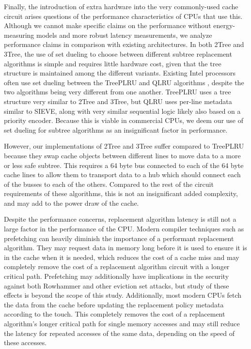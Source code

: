 \documentclass[letterpaper]{article}
\begin{document}
Finally, the introduction of extra hardware into the very commonly-used cache circuit
arises questions of the performance characteristics of CPUs that use this.
Although we cannot make specific claims on the performance without energy-measuring models
and more robust latency measurements,
we analyze performance claims in comparison with existing architectures.
In both 2Tree and 3Tree, the use of set dueling to choose between different subtree replacement algorithms
is simple and requires little hardware cost, given that the tree structure is maintained
among the different variants.
Existing Intel processors often use set dueling between the TreePLRU and QLRU algorithms
\cite{EvictionSetsAtScale}, despite the two algorithms being very different from one another.
TreePLRU uses a tree structure very similar to 2Tree and 3Tree,
but QLRU uses per-line metadata similar to SIEVE,
along with very similar sequential logic likely also based on a priority encoder.
Because this is viable in commercial CPUs, we deem our use of set dueling for subtree algorithms
as an insignificant factor in performance.

However, our implementations of 2Tree and 3Tree suffer compared to TreePLRU
because they swap cache objects between different lines to move data to a more or less safe subtree.
This requires a 64 byte bus connected to each of the 64 byte cache lines
to allow them to transport data to a hub which should connect each of the busses to each of the others.
Compared to the rest of the circuit requirements of these algorithms,
this is not an insignificant added complexity, and may add to the power draw of the cache.

Despite the performance concerns,
replacement algorithm latency is still not a large factor in the performance of the CPU.
Modern compiler techniques such as prefetching can heavily diminish the importance
of a performant replacement algorithm.
They may request data in memory long before it is used to ensure it is in the cache when it is needed,
which reduces the cost of a cache miss
and may completely remove the cost of a replacement algorithm circuit with a longer critical path.
Prefetching may additionally have implications in the security against both Rowhammer
and other eviction set attacks,
but study of these effects is beyond the scope of this study.
Additionally, most modern CPUs fetch the data from the cache before updating the replacement policy metadata
according to the touch.
This completely removes the cost of a replacement algorithm's longer critical path
for single memory accesses
and may still reduce the latency for repeated accesses of the same data,
depending on the speed of these accesses.






\end{document}
